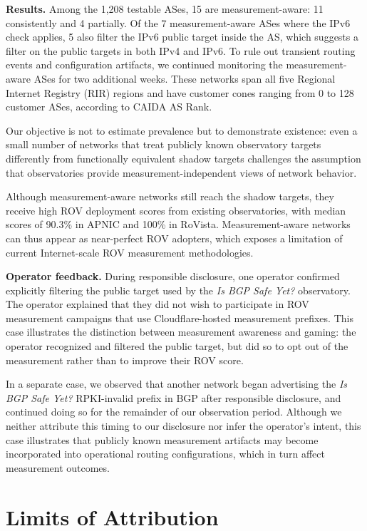 \documentclass[sigconf, 10pt]{acmart}
\begin{document}
\noindent\textbf{Results.} Among the 1,208 testable ASes, 15 are measurement-aware: 11 consistently and 4 partially. Of the 7 measurement-aware ASes where the IPv6 check applies, 5 also filter the IPv6 public target inside the AS, which suggests a filter on the public targets in both IPv4 and IPv6. To rule out transient routing events and configuration artifacts, we continued monitoring the measurement-aware ASes for two additional weeks. These networks span all five Regional Internet Registry (RIR) regions and have customer cones ranging from 0 to 128 customer ASes, according to CAIDA AS Rank. 

Our objective is not to estimate prevalence but to demonstrate existence: even a small number of networks that treat publicly known observatory targets differently from functionally equivalent shadow targets challenges the assumption that observatories provide measurement-independent views of network behavior. 

Although measurement-aware networks still reach the shadow targets, they receive high ROV deployment scores from existing observatories, with median scores of 90.3\% in APNIC and 100\% in RoVista. Measurement-aware networks can thus appear as near-perfect ROV adopters, which exposes a limitation of current Internet-scale ROV measurement methodologies.

\noindent\textbf{Operator feedback.} During responsible disclosure, one operator confirmed explicitly filtering the public target used by the \textit{Is BGP Safe Yet?} observatory. The operator explained that they did not wish to participate in ROV measurement campaigns that use Cloudflare-hosted measurement prefixes. This case illustrates the distinction between measurement awareness and gaming: the operator recognized and filtered the public target, but did so to opt out of the measurement rather than to improve their ROV score. 

In a separate case, we observed that another network began advertising the \textit{Is BGP Safe Yet?} RPKI-invalid prefix in BGP after responsible disclosure, and continued doing so for the remainder of our observation period. Although we neither attribute this timing to our disclosure nor infer the operator's intent, this case illustrates that publicly known measurement artifacts may become incorporated into operational routing configurations, which in turn affect measurement outcomes.

\section{Limits of Attribution}
\end{document}
